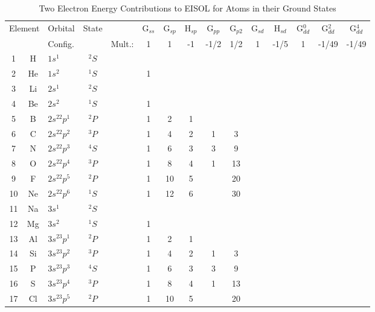 \begin{table}
\caption{\label{confs}Two Electron Energy Contributions to EISOL for Atoms in 
their Ground States}
\begin{center}
\compresstable
\begin{tabular}{cclcccccccccccc}\hline
\multicolumn{2}{c}{Element}   &  Orbital & State&  &
G$_{ss}$ & G$_{sp}$&H$_{sp}$& G$_{pp}$ &G$_{p2}$ &G$_{sd}$&
H$_{sd}$&G$_{dd}^0$&G$_{dd}^2$& G$_{dd}^4$\\ 
&   & Config.& & Mult.: & 1  & 1  &-1 & -1/2&1/2 &  1& -1/5 &1 &-1/49&-1/49\\
\hline
1&H  & $1s^1    $ &$^2S$&&    &    &   &     &    &   &   &    &    &     \\
2&He & $1s^2    $ &$^1S$&& 1  &    &   &     &    &   &   &    &    &     \\
3&Li & $2s^1    $ &$^2S$&&    &    &   &     &    &   &   &    &    &     \\
4&Be & $2s^2    $ &$^1S$&& 1  &    &   &     &    &   &   &    &    &     \\
5&B  & $2s^22p^1$ &$^2P$&& 1  & 2  & 1 &     &    &   &   &    &    &     \\
6&C  & $2s^22p^2$ &$^3P$&& 1  & 4  & 2 &  1  &  3 &   &   &    &    &     \\
7&N  & $2s^22p^3$ &$^4S$&& 1  & 6  & 3 &  3  &9   &   &   &    &    &     \\
8&O  & $2s^22p^4$ &$^3P$&& 1  & 8  & 4 &  1  &13  &   &   &    &    &     \\
9&F  & $2s^22p^5$ &$^2P$&& 1  & 10 & 5 &     &20  &   &   &    &    &     \\
10&Ne & $2s^22p^6$ &$^1S$&& 1  & 12 & 6 &     &30  &   &   &    &    &     \\
11&Na & $3s^1    $ &$^2S$&&    &    &   &     &    &   &   &    &    &     \\
12&Mg & $3s^2    $ &$^1S$&& 1  &    &   &     &    &   &   &    &    &     \\
13&Al & $3s^23p^1$ &$^2P$&& 1  & 2  & 1 &     &    &   &   &    &    &     \\
14&Si & $3s^23p^2$ &$^3P$&& 1  & 4  & 2 &  1  &3   &   &   &    &    &     \\
15&P  & $3s^23p^3$ &$^4S$&& 1  & 6  & 3 &  3  &9   &   &   &    &    &     \\
16&S  & $3s^23p^4$ &$^3P$&& 1  & 8  & 4 &  1  &13  &   &   &    &    &     \\
17&Cl & $3s^23p^5$ &$^2P$&& 1  & 10 & 5 &     &20  &   &   &    &    &     \\

\end{tabular}
\end{center}
\end{table}
